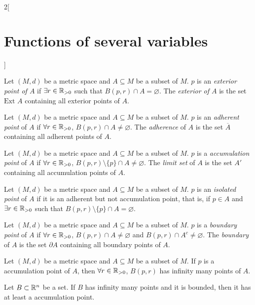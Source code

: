 \documentclass[../../../main.tex]{subfiles}
\begin{document}
\begin{multicols}{2}[\section{Functions of several variables}]
\begin{definition}
  \end{definition}
  \begin{definition}
    Let $(M,d)$ be a metric space and $A\subseteq M$ be a subset of $M$. $p$ is an \textit{exterior point of $A$} if $\exists r\in\mathbb{R}_{>0}$ such that $B(p,r)\cap A=\varnothing$. The \textit{exterior of $A$} is the set $\text{Ext } A$ containing all exterior points of $A$.
  \end{definition}
  \begin{definition}
    Let $(M,d)$ be a metric space and $A\subseteq M$ be a subset of $M$. $p$ is an \textit{adherent point} of $A$ if $\forall r\in\mathbb{R}_{>0}$, $B(p,r)\cap A\ne\varnothing$. The \textit{adherence} of $A$ is the set $\overline{A}$ containing all adherent points of $A$.
  \end{definition}
  \begin{definition}
    Let $(M,d)$ be a metric space and $A\subseteq M$ be a subset of $M$. $p$ is a \textit{accumulation point} of $A$ if $\forall r\in\mathbb{R}_{>0}$, $B(p,r)\setminus\{p\}\cap A\ne\varnothing$. The \textit{limit set} of $A$ is the set $A'$ containing all accumulation points of $A$.
  \end{definition}
  \begin{definition}
    Let $(M,d)$ be a metric space and $A\subseteq M$ be a subset of $M$. $p$ is an \textit{isolated point} of $A$ if it is an adherent but not accumulation point, that is, if $p\in A$ and $\exists r\in\mathbb{R}_{>0}$ such that $B(p,r)\setminus\{p\}\cap A=\varnothing$.
  \end{definition}
  \begin{definition}
    Let $(M,d)$ be a metric space and $A\subseteq M$ be a subset of $M$. $p$ is a \textit{boundary point} of $A$ if $\forall r\in\mathbb{R}_{>0}$, $B(p,r)\cap A\ne\varnothing$ and $B(p,r)\cap A^c\ne\varnothing$. The \textit{boundary} of $A$ is the set $\partial A$ containing all boundary points of $A$.
  \end{definition}
  \begin{prop}
    Let $(M,d)$ be a metric space and $A\subseteq M$ be a subset of $M$. If $p$ is a accumulation point of $A$, then $\forall r\in\mathbb{R}_{>0}$, $B(p,r)$ has infinity many points of $A$.
  \end{prop}
  \begin{theorem}
    Let $B\subset\mathbb{R}^n$ be a set. If $B$ has infinity many points and it is bounded, then it has at least a accumulation point.
  \end{theorem}

\end{multicols}
\end{document}
